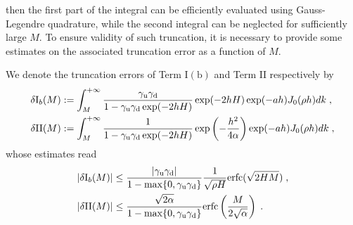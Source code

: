 then the first part of the integral can be efficiently evaluated  using  Gauss-Legendre quadrature, while the second integral can be neglected for sufficiently large $M$. To ensure   validity of such truncation, it is necessary to provide some  estimates on the associated truncation error as a function of $M$.
%
\begin{prop}
We denote the     truncation errors of Term $\mathrm{I(b)}$ and Term $\mathrm{II}$ respectively by
\begin{align*}
  \delta \mathrm{I}_b(M)&:=\int_M^{+\infty} \frac{\gamma_{\mathrm{u}}\gamma_{\mathrm{d}}}{1-\gamma_{\mathrm{u}}\gamma_{\mathrm{d}}\exp(-2hH)}  \exp(-2hH)\exp(-ah)  J_0(\rho h)d k \;,\\  
  \delta \mathrm{II}(M)&:=\int_M^{+\infty}  \frac{1}{1-\gamma_{\mathrm{u}}\gamma_{\mathrm{d}}\exp(-2hH)}\exp\left(-\frac{h^2}{4\alpha}\right)  \exp(-ah)  J_0(\rho h)d k \;,
\end{align*}
whose estimates read
\begin{align}
    \left\lvert\delta \mathrm{I}_b(M)\right\rvert &\leq  \frac{\left\lvert\gamma_{\mathrm{u}}\gamma_{\mathrm{d}}\right\rvert}{1-\max\{0,\gamma_{\mathrm{u}}\gamma_{\mathrm{d}}\}}\frac{1}{\sqrt{\rho H}}\mathrm{erfc}(\sqrt{2HM})\;,\\
    \left\lvert\delta \mathrm{II}(M)\right\rvert &\leq \frac{\sqrt{2\alpha} }{1-\max\{0,\gamma_{\mathrm{u}}\gamma_{\mathrm{d}}\}} \mathrm{erfc}\left(\frac{M}{2\sqrt{\alpha}}\right)\;.
\end{align}
\end{prop}
